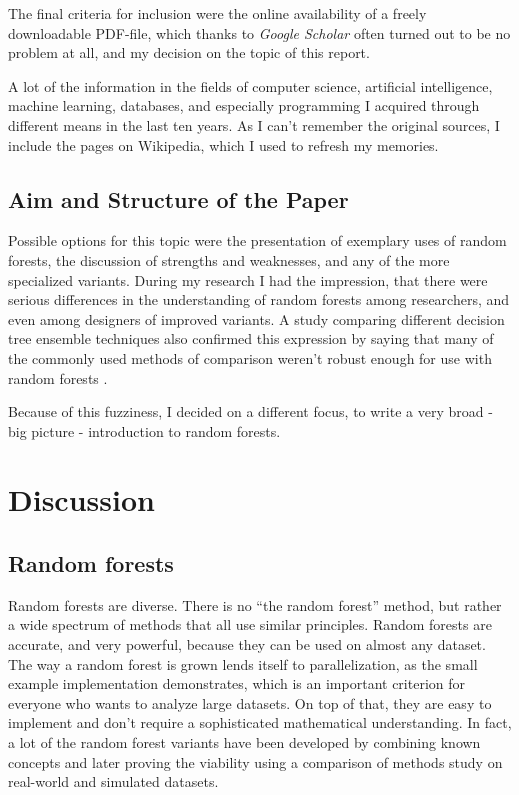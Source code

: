 \documentclass[a4paper,man,12pt,apacite,floatsintext,draftfirst]{apa6} %
\begin{document}
The final criteria for inclusion were the online availability of a freely
downloadable PDF-file, which thanks to \emph{Google Scholar} often turned
out to be no problem at all, and my decision on the topic of
this report.

A lot of the information in the fields of computer science, artificial
intelligence, machine learning, databases, and especially programming
I acquired through different means in the last ten years.
As I can't remember the original sources, I include the pages
on Wikipedia, which I used to refresh my memories.

\subsection{Aim and Structure of the Paper}
Possible options for this topic were the presentation of
exemplary uses of random
forests, the discussion of strengths and weaknesses, and any of the more
specialized variants.
During my research I had the impression, that there were serious
differences in the understanding of random forests among researchers,
and even among designers of improved variants.
A study comparing different decision tree ensemble techniques also confirmed
this expression by saying that many of the commonly used methods of comparison
weren't robust enough for use with random forests \cite{banfield2007comparison}.

Because of this fuzziness, I decided on a different focus, to write
a very broad - big picture - introduction to random forests.

\newpage
\section{Discussion}
\subsection{Random forests}
Random forests are diverse.
There is no “the random forest” method, but rather a wide spectrum of
methods that all use similar principles.
Random forests are accurate, and very powerful, because they can be used
on almost any dataset.
The way a random forest is grown lends itself to parallelization, as the
small example implementation demonstrates, which is an important criterion
for everyone who wants to analyze large datasets.
On top of that, they are easy to implement and don't require a sophisticated
mathematical understanding.
In fact, a lot of the random forest variants have been developed by combining
known concepts and later proving the viability using  a comparison of methods
study on real-world and simulated datasets.
\end{document}
